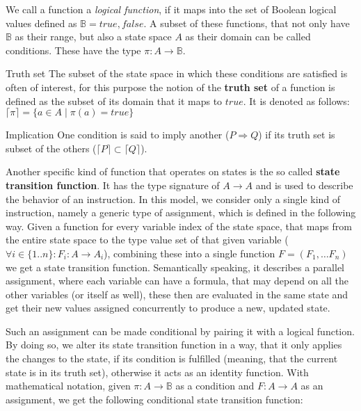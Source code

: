 We call a function a \textit{logical function}, if it maps into the set of Boolean logical values defined as $\mathbb{B} = {true , false}$. A subset of these functions, that not only have $\mathbb{B}$ as their range, but also a state space $A$ as their domain can be called conditions. These have the type $\pi : A \to \mathbb{B}$.

\begin{definition}{Truth set}
\label{def:truth-set}
The subset of the state space in which these conditions are satisfied is often of interest, for this purpose the notion of the \textbf{truth set} of a function is defined as the subset of its domain that it maps to $true$. It is denoted as follows: $\lceil \pi \rceil = \{a \in A \;|\; \pi(a) = true\}$
\end{definition}

\begin{definition}{Implication}
\label{def:implication}
One condition is said to imply another ($P \Rightarrow Q$) if its truth set is subset of the others ($\lceil P \rceil \subset \lceil Q \rceil$).
\end{definition}

Another specific kind of function that operates on states is the so called \textbf{state transition function}. It has the type signature of $A \to A$ and is used to describe the behavior of an instruction. In this model, we consider only a single kind of instruction, namely a generic type of assignment, which is defined in the following way. Given a function for every variable index of the state space, that maps from the entire state space to the type value set of that given variable ($\forall i \in \{1..n\} : F_i : A \to A_i$), combining these into a single function $F = (F_1, \ldots F_n)$ we get a state transition function. Semantically speaking, it describes a parallel assignment, where each variable can have a formula, that may depend on all the other variables (or itself as well), these then are evaluated in the same state and get their new values assigned concurrently to produce a new, updated state.

Such an assignment can be made conditional by pairing it with a logical function. By doing so, we alter its state transition function in a way, that it only applies the changes to the state, if its condition is fulfilled (meaning, that the current state is in its truth set), otherwise it acts as an identity function. With mathematical notation, given $\pi : A \to \mathbb{B}$ as a condition and $F : A \to A$ as an assignment, we get the following conditional state transition function:

